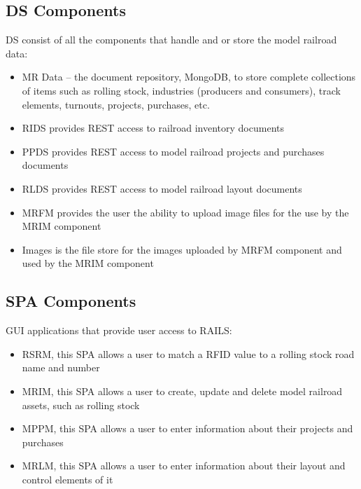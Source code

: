 \subsection{\acl{DS} Components}
\ac{DS} consist of all the components that handle and or store the model railroad data:
\begin{itemize}
  \item MR Data – the document repository, MongoDB, to store complete collections of items such as rolling stock, industries (producers and consumers), track elements, turnouts, projects, purchases, etc.
  \item \ac{RIDS} provides \ac{REST} access to railroad inventory documents
  \item \ac{PPDS} provides \ac{REST} access to model railroad projects and purchases documents
  \item \ac{RLDS} provides \ac{REST} access to model railroad layout documents
  \item \ac{MRFM} provides the user the ability to upload image files for the use by the \ac{MRIM} component
  \item Images is the file store for the images uploaded by \ac{MRFM} component and used by the \ac{MRIM} component
\end{itemize}
\subsection{\acl{SPA} Components}
\ac{GUI} applications that provide user access to \ac{RAILS}:
\begin{itemize}
  \item \ac{RSRM}, this \ac{SPA} allows a user to match a \ac{RFID} value to a rolling stock road name and number
  \item \ac{MRIM}, this \ac{SPA} allows a user to create, update and delete model railroad assets, such as rolling stock
  \item \ac{MPPM}, this \ac{SPA} allows a user to enter information about their projects and purchases
  \item \ac{MRLM}, this \ac{SPA} allows a user to enter information about their layout and control elements of it
\end{itemize}
